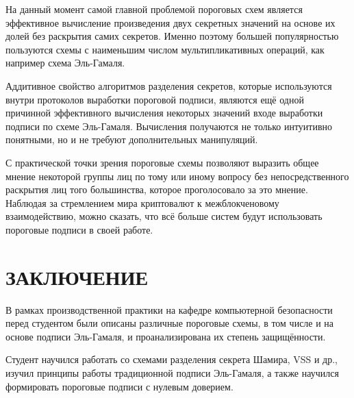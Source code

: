 \documentclass[a4paper,12pt]{article}
\theoremstyle{definition}
\begin{document}
	На данный момент самой главной проблемой пороговых схем является эффективное вычисление произведения двух секретных значений на основе их долей без раскрытия самих секретов. Именно поэтому большей популярностью пользуются схемы с наименьшим числом мультипликативных операций, как например схема Эль-Гамаля.
	
	Аддитивное свойство алгоритмов разделения секретов, которые используются внутри протоколов выработки пороговой подписи, являются ещё одной причинной эффективного вычисления некоторых значений входе выработки подписи по схеме Эль-Гамаля. Вычисления получаются не только интуитивно понятными, но и не требуют дополнительных манипуляций.
	
	С практической точки зрения пороговые схемы позволяют выразить общее мнение некоторой группы лиц по тому или иному вопросу без непосредственного раскрытия лиц того большинства, которое проголосовало за это мнение. Наблюдая за стремлением мира криптовалют к межблокченовому взаимодействию, можно сказать, что всё больше систем будут использовать пороговые подписи в своей работе.
	
	
	\newpage
	\section*{ЗАКЛЮЧЕНИЕ}
	
	В рамках производственной практики на кафедре компьютерной безопасности перед студентом были описаны различные пороговые схемы, в том числе и на основе подписи Эль-Гамаля, и проанализирована их степень защищённости.
	
	Студент научился работать со схемами разделения секрета Шамира, VSS и др., изучил принципы работы традиционной подписи Эль-Гамаля, а также научился формировать пороговые подписи с нулевым доверием. 
	
	
	
\end{document}
